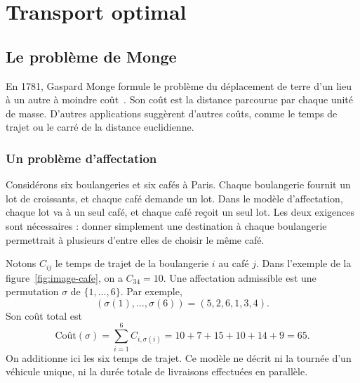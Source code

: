\chapter{Transport optimal}
\label{chap-ot}

\section{Le problème de Monge}
En 1781, Gaspard Monge formule le problème du déplacement de terre d'un lieu à un autre à moindre coût~\cite{Monge1781}. Son coût est la distance parcourue par chaque unité de masse. D'autres applications suggèrent d'autres coûts, comme le temps de trajet ou le carré de la distance euclidienne.

\subsection{Un problème d'affectation}
Considérons six boulangeries et six cafés à Paris. Chaque boulangerie fournit un lot de croissants, et chaque café demande un lot. Dans le modèle d'affectation, chaque lot va à un seul café, et chaque café reçoit un seul lot. Les deux exigences sont nécessaires : donner simplement une destination à chaque boulangerie permettrait à plusieurs d'entre elles de choisir le même café.

Notons $C_{ij}$ le temps de trajet de la boulangerie $i$ au café $j$. Dans l'exemple de la figure~\ref{fig:image-cafe}, on a $C_{34}=10$. Une affectation admissible est une permutation $\sigma$ de $\{1,\ldots,6\}$. Par exemple,
\begin{equation}\label{eq-bijection-exmp}
 (\sigma(1),\ldots,\sigma(6))=(5,2,6,1,3,4).
\end{equation}
Son coût total est
\begin{equation}\label{eq:cout}
 \text{Coût}(\sigma)=\sum_{i=1}^6 C_{i,\sigma(i)}
 =10+7+15+10+14+9=65.
\end{equation}
On additionne ici les six temps de trajet. Ce modèle ne décrit ni la tournée d'un véhicule unique, ni la durée totale de livraisons effectuées en parallèle.

